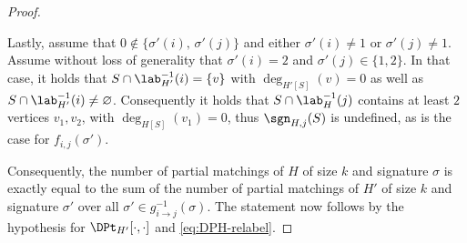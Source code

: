 \begin{proof}
\begin{claimproof}
        Lastly, assume that $0 \notin \{\sigma'(i), \, \sigma'(j)\}$ and either $\sigma'(i) \neq 1$ or $\sigma'(j) \neq 1$.
        Assume without loss of generality that $\sigma'(i) = 2$ and $\sigma'(j) \in \{1,2\}$.
        In that case, it holds that $S \cap \lab^{-1}_{H'}(i) = \{v\}$ with $\deg_{H'[S]}(v) = 0$
        as well as $S \cap \lab^{-1}_{H'}(i) \neq \varnothing$.
        Consequently it holds that $S \cap \lab^{-1}_H(j)$ contains at least $2$ vertices $v_1,v_2$, with $\deg_{H[S]}(v_1) = 0$,
        thus $\sgn_{H,j}(S)$ is undefined, as is the case for $f_{i,j}(\sigma')$.
    \end{claimproof}

    Consequently, the number of partial matchings of $H$ of size $k$ and signature $\sigma$
    is exactly equal to the sum of the number of partial matchings of $H'$ of size $k$ and signature $\sigma'$
    over all $\sigma' \in g^{-1}_{i \to j}(\sigma)$.
    The statement now follows by the hypothesis for $\DPt_{H'}[\cdot,\cdot]$ and \cref{eq:DPH-relabel}.
\end{proof}

